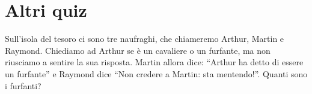 \section{Altri quiz}
\label{sec:quiz_altri}

\begin{esercizio}
    \label{ex:fiorini_1_1_4}
    Sull'isola del tesoro ci sono tre naufraghi, che chiameremo Arthur, Martin e Raymond.
    Chiediamo ad Arthur se è un cavaliere o un furfante, ma non riusciamo a sentire la sua risposta.
    Martin allora dice: “Arthur ha detto di essere un furfante” e Raymond dice “Non credere a Martin: sta mentendo!”.
    Quanti sono i furfanti?
\end{esercizio}
